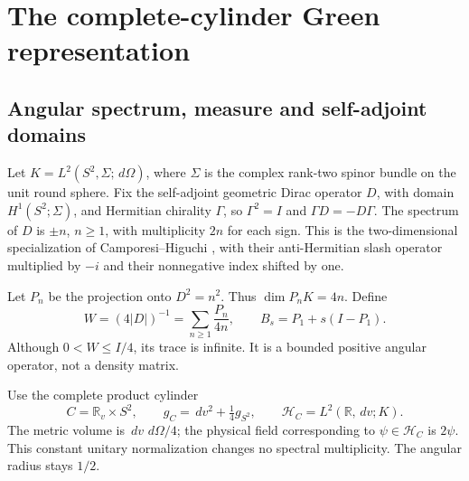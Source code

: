 \documentclass[11pt,letterpaper]{article}
\numberwithin{equation}{section}
\theoremstyle{remark}
\newcommand{\R}{\mathbb R}
\newcommand{\dd}{\,d}
\newcommand{\hc}{\mathcal H_C}
\begin{document}
\section{The complete-cylinder Green representation}
\label{sec:cylinder}

\subsection{Angular spectrum, measure and self-adjoint domains}

Let \(K=L^2(S^2,\Sigma;\dd\Omega)\), where \(\Sigma\) is the complex
rank-two spinor bundle on the unit round sphere. Fix the self-adjoint
geometric Dirac operator \(D\), with domain \(H^1(S^2;\Sigma)\),
and Hermitian chirality \(\Gamma\), so
\(\Gamma^2=I\) and \(\Gamma D=-D\Gamma\).
The spectrum of \(D\) is \(\pm n\), \(n\ge1\), with multiplicity
\(2n\) for each sign. This is the two-dimensional specialization of
Camporesi--Higuchi \cite[Section 3.1, equation (3.54)]{CH}, with
their anti-Hermitian slash operator multiplied by \(-i\) and their
nonnegative index shifted by one.

Let \(P_n\) be the projection onto \(D^2=n^2\). Thus
\(\dim P_nK=4n\). Define
\begin{equation}
 W=(4|D|)^{-1}=\sum_{n\ge1}\frac{P_n}{4n},\qquad
 B_s=P_1+s(I-P_1).
 \label{eq:weight}
\end{equation}
Although \(0<W\le I/4\), its trace is infinite. It is a bounded
positive angular operator, not a density matrix.

Use the complete product cylinder
\begin{equation}
 C=\R_v\times S^2,\qquad g_C=\dd v^2+\tfrac14g_{S^2},\qquad
 \hc=L^2(\R,\dd v;K).
 \label{eq:cylinder}
\end{equation}
The metric volume is \(\dd v\,\dd\Omega/4\); the physical field
corresponding to \(\psi\in\hc\) is \(2\psi\).
This constant unitary normalization changes no spectral multiplicity.
The angular radius stays \(1/2\).
\end{document}
